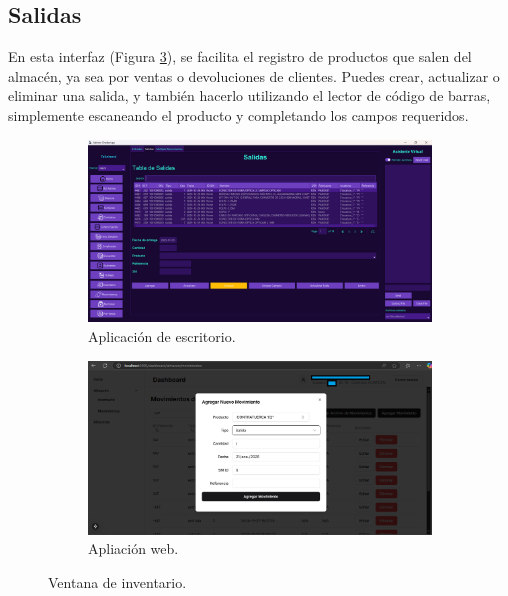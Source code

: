 \subsection{Salidas}

En esta interfaz (Figura \ref{fig:outs}), se facilita el registro de productos que salen del almacén, ya sea por ventas o devoluciones de clientes. Puedes crear, actualizar o eliminar una salida, y también hacerlo utilizando el lector de código de barras, simplemente escaneando el producto y completando los campos requeridos. 

\begin{figure}[ht!]
\centering
\begin{subfigure}{0.45\textwidth}
    \includegraphics[width=\textwidth]{imgs/OutsApp.png}
    \caption{Aplicación de escritorio.}
    \label{fig:outs1}
\end{subfigure}
\hfill
\begin{subfigure}{0.45\textwidth}
    \includegraphics[width=\textwidth]{imgs/OutsWebApp.png}
    \caption{Apliación web.}
    \label{fig:outs2}
\end{subfigure}        
\caption{Ventana de inventario.}
\label{fig:outs}
\end{figure}

